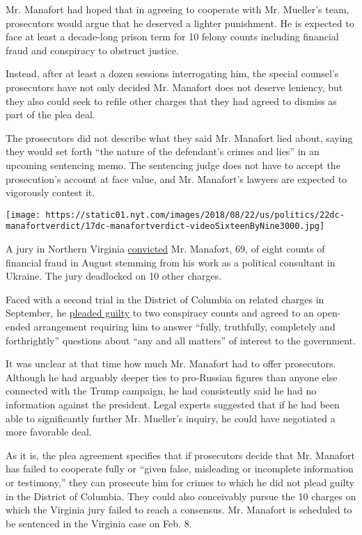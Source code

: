 Mr. Manafort had hoped that in agreeing to cooperate with Mr. Mueller's
team, prosecutors would argue that he deserved a lighter punishment. He
is expected to face at least a decade-long prison term for 10 felony
counts including financial fraud and conspiracy to obstruct justice.

Instead, after at least a dozen sessions interrogating him, the special
counsel's prosecutors have not only decided Mr. Manafort does not
deserve leniency, but they also could seek to refile other charges that
they had agreed to dismiss as part of the plea deal.

The prosecutors did not describe what they said Mr. Manafort lied about,
saying they would set forth ``the nature of the defendant's crimes and
lies'' in an upcoming sentencing memo. The sentencing judge does not
have to accept the prosecution's account at face value, and Mr.
Manafort's lawyers are expected to vigorously contest it.

\texttt{[image: https://static01.nyt.com/images/2018/08/22/us/politics/22dc-manafortverdict/17dc-manafortverdict-videoSixteenByNine3000.jpg]}

A jury in Northern Virginia
\href{https://www.nytimes.com/2018/08/21/us/politics/paul-manafort-trial-verdict.html}{convicted}
Mr. Manafort, 69, of eight counts of financial fraud in August stemming
from his work as a political consultant in Ukraine. The jury deadlocked
on 10 other charges.

Faced with a second trial in the District of Columbia on related charges
in September, he
\href{https://www.nytimes.com/2018/09/14/us/politics/manafort-plea-deal.html}{pleaded
guilty} to two conspiracy counts and agreed to an open-ended arrangement
requiring him to answer ``fully, truthfully, completely and
forthrightly'' questions about ``any and all matters'' of interest to
the government.

It was unclear at that time how much Mr. Manafort had to offer
prosecutors. Although he had arguably deeper ties to pro-Russian figures
than anyone else connected with the Trump campaign, he had consistently
said he had no information against the president. Legal experts
suggested that if he had been able to significantly further Mr.
Mueller's inquiry, he could have negotiated a more favorable deal.

As it is, the plea agreement specifies that if prosecutors decide that
Mr. Manafort has failed to cooperate fully or ``given false, misleading
or incomplete information or testimony,'' they can prosecute him for
crimes to which he did not plead guilty in the District of Columbia.
They could also conceivably pursue the 10 charges on which the Virginia
jury failed to reach a consensus. Mr. Manafort is scheduled to be
sentenced in the Virginia case on Feb. 8.

